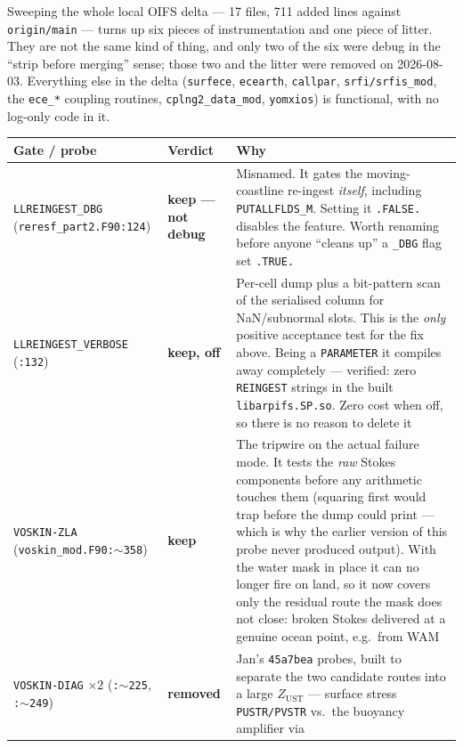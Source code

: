 \documentclass[11pt,a4paper]{article}
\newcommand{\code}[1]{\texttt{\small #1}}
\begin{document}
Sweeping the whole local OIFS delta --- 17 files, 711 added lines against \code{origin/main} ---
turns up six pieces of instrumentation and one piece of litter. They are not the same kind of thing,
and only two of the six were debug in the ``strip before merging'' sense; those two and the litter
were removed on 2026-08-03. Everything else in the delta (\code{surfece}, \code{ecearth},
\code{callpar}, \code{srfi/srfis\_mod}, the \code{ece\_*} coupling routines,
\code{cplng2\_data\_mod}, \code{yomxios}) is functional, with no log-only code in it.

\begin{center}\small
\begin{tabular}{@{}p{4.1cm}p{2.0cm}p{9.4cm}@{}}
\toprule
\textbf{Gate / probe} & \textbf{Verdict} & \textbf{Why} \\
\midrule
\code{LLREINGEST\_DBG} \newline (\code{reresf\_part2.F90:124}) & \textbf{keep --- not debug} &
Misnamed. It gates the moving-coastline re-ingest \emph{itself}, including \code{PUTALLFLDS\_M}.
Setting it \code{.FALSE.} disables the feature. Worth renaming before anyone ``cleans up'' a
\code{\_DBG} flag set \code{.TRUE.} \\
\code{LLREINGEST\_VERBOSE} \newline (\code{:132}) & \textbf{keep, off} &
Per-cell dump plus a bit-pattern scan of the serialised column for NaN/subnormal slots. This is the
\emph{only} positive acceptance test for the fix above. Being a \code{PARAMETER} it compiles away
completely --- verified: zero \code{REINGEST} strings in the built \code{libarpifs.SP.so}. Zero cost
when off, so there is no reason to delete it \\
\code{VOSKIN-ZLA} \newline (\code{voskin\_mod.F90:$\sim$358}) & \textbf{keep} &
The tripwire on the actual failure mode. It tests the \emph{raw} Stokes components before any
arithmetic touches them (squaring first would trap before the dump could print --- which is why the
earlier version of this probe never produced output). With the water mask in place it can no longer
fire on land, so it now covers only the residual route the mask does not close: broken Stokes
delivered at a genuine ocean point, e.g.\ from WAM \\
\code{VOSKIN-DIAG} $\times2$ \newline (\code{:$\sim$225}, \code{:$\sim$249}) & \textbf{removed} &
Jan's \code{45a7bea} probes, built to separate the two candidate routes into a large
$Z_\mathrm{UST}$ --- surface stress \code{PUSTR/PVSTR} vs.\ the buoyancy amplifier via

\end{tabular}
\end{center}
\end{document}
